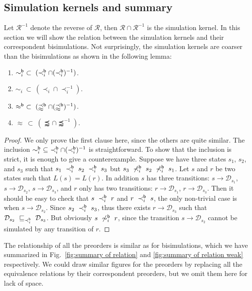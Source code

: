 \documentclass{LMCS}
\newcommand{\TRAN}[2]{#1\rightarrow #2}
\newcommand{\WBS}{\approx}
\newcommand{\WSi}{\precapprox}
\newcommand{\iBS}[1]{\sim_{#1}}
\newcommand{\iBSB}[1]{\sim_{#1}^{{\sf b}}}
\newcommand{\iSi}[1]{\prec_{#1}}
\newcommand{\iBSi}[1]{\prec_{#1}^{{\sf b}}}
\newcommand{\MC}[1]{\mathcal{#1}}
\newcommand{\DSI}[1][\MC{R}]{\sqsubseteq_{#1}}
\newcommand{\DIRAC}[1]{\mathcal{D}_{#1}}
\newcommand{\WBSB}{\approx^{{\sf b}}}
\newcommand{\WBSi}{\precapprox^{{\sf b}}}
\begin{document}
\subsection{Simulation kernels and summary}
Let $\MC{R}^{-1}$ denote the reverse of $\MC{R}$, then
$\MC{R}\cap\MC{R}^{-1}$ is the simulation kernel. In this section we
will show the relation between the simulation kernels and their
correspondent bisimulations. Not surprisingly, the simulation kernels
are coarser than the bisimulations as shown in the following lemma:
\begin{lem}\hfill
\begin{enumerate}[\em(1)]
\item $\iBSB{i}~\subset~(\iBSi{i}\cap(\iBSi{i})^{-1})$.
\item $\iBS{i}~\subset~(\iSi{i}\cap\iSi{i}^{-1})$.
\item $\WBSB~\subset~(\WBSi\cap(\WBSi)^{-1})$.
\item $\WBS~\subset~(\WSi\cap\WSi^{-1})$.
\end{enumerate}
\end{lem}
\begin{proof}
  We only prove the first clause here, since the others are quite
  similar.  The inclusion
  $\iBSB{i}~\subseteq~\iBSi{i}\cap(\iBSi{i})^{-1}$ is straightforward.
  To show that the inclusion is strict, it is enough to give a
  counterexample. Suppose we have three states $s_1$, $s_2$, and $s_3$
  such that $s_1~\iBSi{i}~s_2~\iBSi{i}~s_3$ but
  $s_3~\not\iBSi{i}~s_2~\not\iBSi{i}~s_1$. Let $s$ and $r$ be two
  states such that $L(s)=L(r)$. In addition $s$ has three transitions:
  $\TRAN{s}{\DIRAC{s_1}}$, $\TRAN{s}{\DIRAC{s_2}}$,
  $\TRAN{s}{\DIRAC{s_3}}$, and $r$ only has two transitions:
  $\TRAN{r}{\DIRAC{s_1}}$, $\TRAN{r}{\DIRAC{s_3}}$. Then it should be
  easy to check that $s~\iBSi{i}~r$ and $r~\iBSi{i}~s$, the only
  non-trivial case is when $\TRAN{s}{\DIRAC{s_2}}$. Since
  $s_2~\iBSi{i}~s_3$, thus there exists $\TRAN{r}{\DIRAC{s_3}}$ such
  that $\DIRAC{s_2}~\DSI[\iBSi{i}]~\DIRAC{s_3}$. But obviously
  $s~\not\iBSB{i}~r$, since the transition $\TRAN{s}{\DIRAC{s_2}}$
  cannot be simulated by any transition of $r$.
\end{proof}

The relationship of all the preorders is similar as for bisimulations,
which we have summarized in Fig.~\ref{fig:summary of relation} and
\ref{fig:summary of relation weak} respectively.  We could draw
similar figures for the preorders by replacing all the equivalence
relations by their correspondent preorders, but we omit them here for
lack of space.
\end{document}
